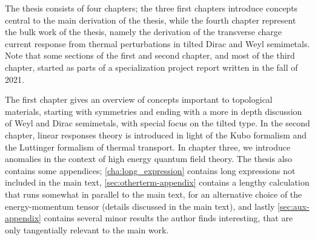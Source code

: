 The thesis consists of four chapters;
the three first chapters introduce concepts central to the main derivation of the thesis, while the fourth chapter represent the bulk work of the thesis, namely the derivation of the transverse charge current response from thermal perturbations in tilted Dirac and Weyl semimetals.
Note that some sections of the first and second chapter, and most of the third chapter, started as parts of a specialization project report written in the fall of 2021.

The first chapter gives an overview of concepts important to topological materials, starting with symmetries and ending with a more in depth discussion of Weyl and Dirac semimetals, with special focus on the tilted type.
In the second chapter, linear responses theory is introduced in light of the Kubo formalism and the Luttinger formalism of thermal transport.
In chapter three, we introduce anomalies in the context of high energy quantum field theory.
The thesis also contains some appendices;
\cref{cha:long_expression} contains long expressions not included in the main text, \cref{sec:otherterm-appendix} contains a lengthy calculation that runs somewhat in parallel to the main text, for an alternative choice of the energy-momentum tensor (details discussed in the main text), and lastly \cref{sec:aux-appendix} contains several minor results the author finds interesting, that are only tangentially relevant to the main work.


